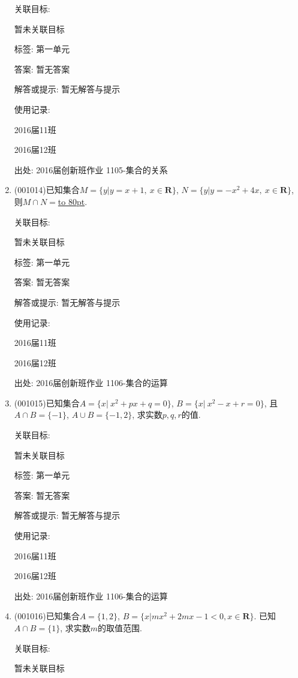 \documentclass[10pt,a4paper]{article}
\newcommand{\blank}[1]{\underline{\hbox to #1pt{}}}
\begin{document}
\begin{enumerate}[1.]
关联目标:

暂未关联目标



标签: 第一单元

答案: 暂无答案

解答或提示: 暂无解答与提示

使用记录:

2016届11班	

2016届12班	


出处: 2016届创新班作业	1105-集合的关系
\item { (001014)}已知集合$M=\{y|y=x+1, \ x \in \mathbf{R}\}$, $N=\{y|y=-x^2+4x,\  x \in \mathbf{R}\}$,
则$M \cap N=$\blank{80}.


关联目标:

暂未关联目标



标签: 第一单元

答案: 暂无答案

解答或提示: 暂无解答与提示

使用记录:

2016届11班	

2016届12班	


出处: 2016届创新班作业	1106-集合的运算
\item { (001015)}已知集合$A=\{x|\ x^2+px+q=0\}$, $B=\{x|\ x^2-x+r=0\}$, 且$A\cap B=\{-1\}$, $A\cup B=\{-1,2\}$, 求实数$p,q,r$的值.


关联目标:

暂未关联目标



标签: 第一单元

答案: 暂无答案

解答或提示: 暂无解答与提示

使用记录:

2016届11班	

2016届12班	


出处: 2016届创新班作业	1106-集合的运算
\item { (001016)}已知集合$A=\{1,2\}$, $B=\{x|mx^2+2mx-1<0, x \in\mathbf{R}\}$. 已知$A \cap B=\{1\}$, 求实数$m$的取值范围.


关联目标:

暂未关联目标




\end{enumerate}
\end{document}
